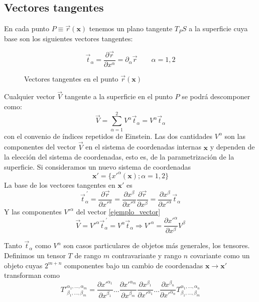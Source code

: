 \subsection{Vectores tangentes}

En cada punto $P\equiv\vec{r}(\mathbf{x})$ tenemos un plano tangente $T_PS$ a
la superficie cuya base son los siguientes vectores tangentes:

\begin{equation*}
\vec{t}_{\alpha}=\frac{\partial \vec{r}}{\partial
  x^{\alpha}}=\partial_{\alpha}\vec{r} \qquad \alpha=1,2
\end{equation*}

\begin{figure}[h]
\centering
 
\caption{Vectores tangentes en el punto $\vec{r}(\mathbf{x})$}
\end{figure}

Cualquier vector $\vec{V}$ tangente a la superficie en el punto $P$ se podrá
descomponer como:
\begin{equation}\label{ejemplo_vector} 
  \vec{V}=\sum^2_{\alpha=1}V^{\alpha}\vec{t}_{\alpha}=V^{\alpha}\vec{t}_{\alpha}
\end{equation}
con el convenio de índices repetidos de Einstein. Las dos cantidades
$V^{\alpha}$ son las componentes del vector $\vec{V}$ en el sistema de
coordenadas internas $\mathbf{x}$ y dependen de la elección del sistema de
coordenadas, esto es, de la parametrización de la superficie. Si consideramos
un nuevo sistema de coordenadas  
\begin{equation*}
 \mathbf{x}'=\{x'^{\alpha}(\mathbf{x}); \alpha=1,2\}
\end{equation*}
La base de los vectores tangentes en $\mathbf{x}'$ es
\begin{equation*}
\vec{t}_{\alpha}^{\ '}=\frac{\partial \vec{r}}{\partial x'^{\alpha}}=
\frac{\partial x^{\beta}}{\partial x'^{\alpha}}\frac{\partial \vec{r}}{\partial x^{\beta}}=\frac{\partial x^{\beta}}{\partial x'^{\alpha}}\vec{t}_{\alpha}
\end{equation*}
Y las componentes $V'^{\alpha}$ del vector \eqref{ejemplo_vector}
\begin{equation} 
  \vec{V}=V'^{\alpha}\vec{t}_{\alpha}^{\
    '}=V^{\alpha}\vec{t}_{\alpha}\Rightarrow V'^{\alpha}=\frac{\partial x'^{\alpha}}{\partial x^{\beta}}V^{\beta}
\end{equation}

Tanto $\vec{t}_{\alpha}$ como $V^{\alpha}$ son casos particulares de objetos
más generales, los tensores. Definimos un tensor $T$ de rango $m$
contravariante y rango $n$ covariante como un objeto cuyas $2^{m+n}$ componentes
bajo un cambio de coordenadas $\mathbf{x}\rightarrow\mathbf{x'}$ transforman
como 
\begin{equation*}
T'^{\alpha_1,\dots,\alpha_m}_{\beta_1,\dots,\beta_m}=
\frac{\partial x'^{\alpha_1}}{\partial x^{\beta_1}}\dots \frac{\partial
  x'^{\alpha_m}}{\partial x^{\beta_m}}
\frac{\partial x^{\beta_1}}{\partial x'^{\alpha_1}}\dots \frac{\partial
  x^{\beta_n}}{\partial x'^{\alpha_n}}T^{\alpha_1,\dots,\alpha_n}_{\beta_1,\dots,\beta_m}
\end{equation*}

